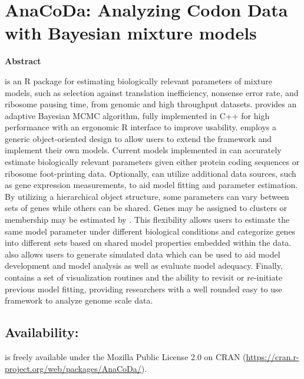 \chapter{AnaCoDa: Analyzing Codon Data with Bayesian mixture models} 
\label{ch:anacoda}

\newpage
\begin{center}\textbf{Abstract}\end{center}
\textbf{\package} is an R package for estimating biologically relevant parameters of mixture models, such as selection against translation inefficiency, nonsense error rate, and ribosome pausing time, from genomic and high throughput datasets.
\package provides an adaptive Bayesian MCMC algorithm, fully implemented in C++ for high performance with an ergonomic R interface to improve usability. 
\package employs a generic object-oriented design to allow users to extend the framework and implement their own models.
Current models implemented in \package can accurately estimate biologically relevant parameters given either protein coding sequences or ribosome foot-printing data.
Optionally, \package can utilize additional data sources, such as gene expression measurements, to aid model fitting and parameter estimation.
By utilizing a hierarchical object structure, some parameters can vary between sets of genes while others can be shared.
Genes may be assigned to clusters or membership may be estimated by \package.
This flexibility allows users to estimate the same model parameter under different biological conditions and categorize genes into different sets based on shared model properties embedded within the data.
\package also allows users to generate simulated data which can be used to aid model development and model analysis as well as evaluate model adequacy.
Finally, \package contains a set of visualization routines and the ability to revisit or re-initiate previous model fitting, providing researchers with a well rounded easy to use framework to analyze genome scale data.

\section*{Availability:}
\textbf{\package} is freely available under the Mozilla Public License 2.0
on CRAN (\url{https://cran.r-project.org/web/packages/AnaCoDa/}).


